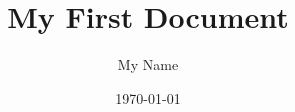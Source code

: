 \documentclass[a4paper,12pt]{article}
\begin{document}
\title{My First Document}
\author{My Name}
\date{\today}
\maketitle
\end{document}
